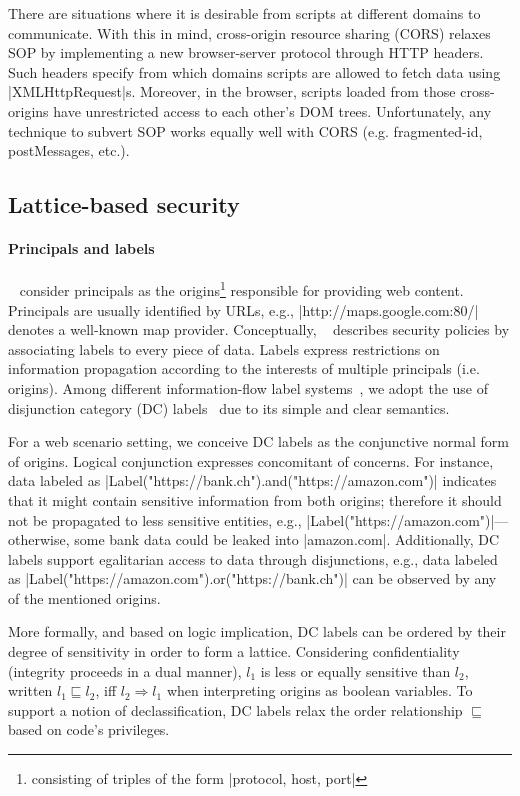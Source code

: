 There are situations where it is desirable from scripts at different domains to
communicate. With this in mind, cross-origin resource sharing (CORS) relaxes SOP
by implementing a new browser-server protocol through HTTP headers.  Such
headers specify from which domains scripts are allowed to fetch data 
using \js|XMLHttpRequest|s. Moreover, in the browser, scripts loaded from
those cross-origins have unrestricted access to each other's DOM
trees. Unfortunately, any technique to subvert SOP works equally well with CORS 
(e.g. fragmented-id, postMessages, etc.).


\subsection{Lattice-based security}

\paragraph{Principals and labels}

\sys~ consider principals as the origins\footnote{consisting of triples of the
  form \js|{protocol, host, port}|} responsible for providing web
content. Principals are usually identified by URLs, e.g., 
\js|http://maps.google.com:80/| denotes a well-known map provider.
Conceptually, \sys~ describes security policies by associating labels to every
piece of data. Labels express restrictions on information propagation according
to the interests of multiple principals (i.e. origins). Among different
information-flow label systems~\cite{GenLabels}, we adopt the use of disjunction
category (DC) labels~\cite{stefan:2011:dclabels} due to its simple and clear
semantics.

For a web scenario setting, we conceive DC labels as the conjunctive normal form
of origins. Logical conjunction expresses concomitant of concerns. For instance,
data labeled as \js|Label("https://bank.ch").and("https://amazon.com")|
indicates that it might contain sensitive information from both origins;
therefore it should not be propagated to less sensitive entities, e.g.,
\js|Label("https://amazon.com")|---otherwise, some bank data could be leaked
into \js|amazon.com|. Additionally, DC labels support egalitarian access to data
through disjunctions, e.g., data labeled as 
\js|Label("https://amazon.com").or("https://bank.ch")| can be
observed by any of the mentioned origins. 

More formally, and based on logic implication, DC labels can be ordered by their
degree of sensitivity in order to form a lattice. Considering confidentiality
(integrity proceeds in a dual manner), $l_1$ is less or equally sensitive than
$l_2$, written $l_1 \sqsubseteq l_2$, iff $l_2 \Rightarrow l_1$ when
interpreting origins as boolean variables. To support a notion of 
declassification, DC labels relax the order relationship $\sqsubseteq$ based
on code's privileges.  



